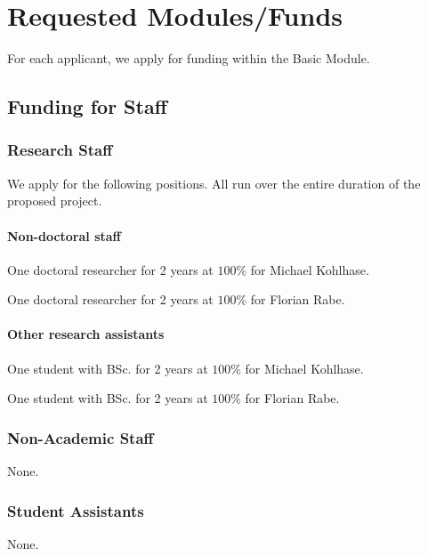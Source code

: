 \section{Requested Modules/Funds}\label{sec:funds}

For each applicant, we apply for funding within the Basic Module.

\subsection{Funding for Staff}\label{sec:positions}

\subsubsection{Research Staff}\label{sec:positions:research}

We apply for the following positions. All run over the entire duration of the proposed project.

\paragraph*{Non-doctoral staff}

One doctoral researcher for 2 years at $100 \%$ for Michael Kohlhase.

One doctoral researcher for 2 years at $100 \%$ for Florian Rabe.


\paragraph*{Other research assistants}

One student with BSc. for 2 years at $100 \%$ for Michael Kohlhase.

One student with BSc. for 2 years at $100 \%$ for Florian Rabe.

\subsubsection{Non-Academic Staff} None.

\subsubsection{Student Assistants} None.


